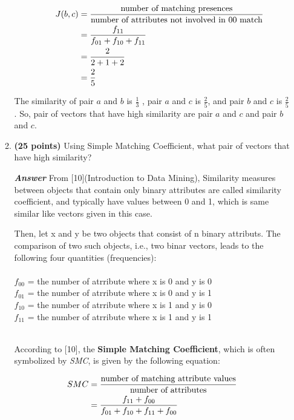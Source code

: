 \documentclass[12pt]{article}%
\begin{document}
\begin{enumerate}
\begin{enumerate}
\begin{enumerate}
			\begin{align*}
				J(b,c) & = \frac{\textup{number of matching presences}}{\textup{number of attributes not involved in 00 match}} \\
				& = \frac{f_{11}}{f_{01}+f_{10}+f_{11}} \\
				& = \frac{2}{2+1 +2} \\
				& = \frac{2}{5} \\
			\end{align*}
			
		\end{enumerate}

		\par The similarity of pair $a$ and $b$ is $\frac{1}{3}$ , pair $a$ and $c$ is $\frac{2}{5}$, and pair $b$ and $c$ is $\frac{2}{5}$. So, pair of vectors that have high similarity are pair $a$ and $c$ and pair $b$ and $c$.


		\item \textbf{(25 points)} Using Simple Matching Coefficient, what pair of vectors that have high similarity?
		\par \textbf{\textit{Answer}} From [10](Introduction to Data Mining), Similarity measures between objects that contain only binary attributes are called similarity coefficient, and typically have values between 0 and 1, which is same similar like vectors given in this case. 
		\par Then, let x and y be two objects that consist of n binary attributs. The comparison of two such objects, i.e., two binar vectors, leads to the following four quantities (frequencies):\\ \\
		$f_{00}$ = the number of atrribute where x is 0 and y is 0 \\
		$f_{01}$ = the number of atrribute where x is 0 and y is 1 \\
		$f_{10}$ = the number of atrribute where x is 1 and y is 0 \\
		$f_{11}$ = the number of atrribute where x is 1 and y is 1 \\ \\

		\par According to [10], the \textbf{Simple Matching Coefficient}, which is often symbolized by \textit{SMC}, is given by the following equation:

		\begin{equation}
		\begin{split}
			SMC & = \frac{\textup{number of matching attribute values}}{\textup{number of attributes}} \\
			& = \frac{f_{11}+f_{00}}{f_{01}+f_{10}+f_{11}+f_{00}}
		\end{split}
		\end{equation}


\end{enumerate}
\end{enumerate}
\end{document}
